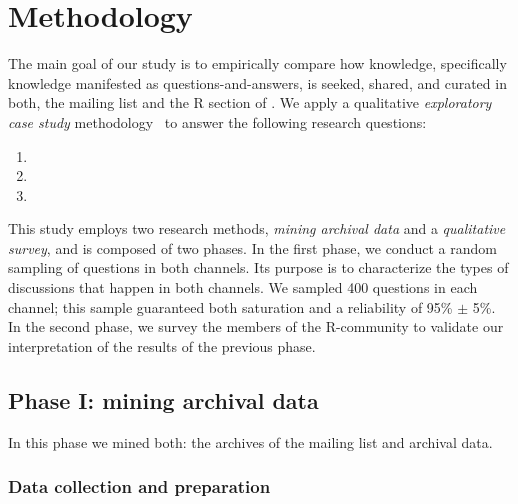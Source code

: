 \section{Methodology}
\label{cha:methodology}

The main goal of our study is to empirically compare how knowledge, specifically knowledge manifested as questions-and-answers, is seeked, shared, and curated in both, the \RH mailing list and the R section of \SO. We apply a qualitative \textit{exploratory case study} methodology~\cite{Creswell2009,Runeson2012} to answer the following research questions:
    \begin{enumerate}[label=\bfseries{RQ-\arabic*.},itemsep=3pt, topsep=2pt, leftmargin=3em, parsep=0pt]
        \item \rqa
        \item \rqb
        \item \rqc
     \end{enumerate}


This study employs two research methods, \textit{mining archival data} and a \textit{qualitative survey}, and is composed of two phases. In the first phase, we conduct a random sampling of questions in both channels. Its purpose is to characterize the types of discussions that happen in both channels. We sampled 400 questions in each channel; this sample guaranteed both saturation and a reliability of 95\% $\pm$ 5\%.  In the second phase, we survey the members of the R-community to validate our interpretation of the results of the previous phase. %

\subsection{Phase I: mining archival data} 
\label{sec:studyDesign}

In this phase we mined both: the archives of the \RH mailing list and \SO archival data.

\subsubsection{Data collection and preparation}
\label{subsec:preparation}

